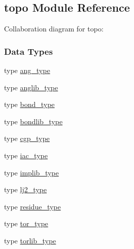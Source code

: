 \hypertarget{classtopo}{\subsection{topo Module Reference}
\label{classtopo}
}


Collaboration diagram for topo\-:
\subsubsection*{Data Types}
\begin{DoxyCompactItemize}
\item 
type \hyperlink{structtopo_1_1ang__type}{ang\-\_\-type}
\item 
type \hyperlink{structtopo_1_1anglib__type}{anglib\-\_\-type}
\item 
type \hyperlink{structtopo_1_1bond__type}{bond\-\_\-type}
\item 
type \hyperlink{structtopo_1_1bondlib__type}{bondlib\-\_\-type}
\item 
type \hyperlink{structtopo_1_1cgp__type}{cgp\-\_\-type}
\item 
type \hyperlink{structtopo_1_1iac__type}{iac\-\_\-type}
\item 
type \hyperlink{structtopo_1_1implib__type}{implib\-\_\-type}
\item 
type \hyperlink{structtopo_1_1lj2__type}{lj2\-\_\-type}
\item 
type \hyperlink{structtopo_1_1residue__type}{residue\-\_\-type}
\item 
type \hyperlink{structtopo_1_1tor__type}{tor\-\_\-type}
\item 
type \hyperlink{structtopo_1_1torlib__type}{torlib\-\_\-type}
\end{DoxyCompactItemize}
